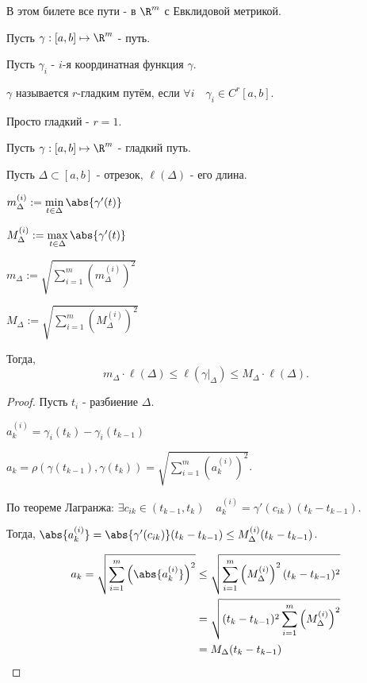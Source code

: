 
В этом билете все пути - в $\R^{m}$ с Евклидовой метрикой.

\begin{definition} \thmslashn 

    Пусть $\gamma : [a, b] \mapsto \R^{m}$ - путь.

    Пусть $\gamma_{i} $ - $i$-я координатная функция $\gamma$.

    $\gamma$ называется $r$-гладким путём, если $\forall{i}\quad \gamma_{i}\in C^{r}[a, b]$.

    Просто гладкий - $r = 1$.
\end{definition}

\begin{lemma} \thmslashn

    Пусть $\gamma : [a, b] \mapsto \R^{m}$ - гладкий путь.

    Пусть $\Delta \subset [a, b]$ - отрезок, $\ell(\Delta)$ - его длина.

    $m^{(i)}_{\Delta} := \min\limits_{t\in \Delta} \abs{\gamma'(t)}$
    
    $M^{(i)}_{\Delta} := \max\limits_{t\in \Delta} \abs{\gamma'(t)}$

    $m_{\Delta} := \sqrt{\sum\limits_{i=1}^{m} \left(m^{(i)}_{\Delta}\right)^2} $
    
    $M_{\Delta} := \sqrt{\sum\limits_{i=1}^{m} \left(M^{(i)}_{\Delta}\right)^2}$

    Тогда, 
    \[ m_{\Delta} \cdot \ell(\Delta) \le \ell(\left. \gamma\right|_{\Delta}) \le M_{\Delta} \cdot \ell(\Delta) .\]
        \begin{proof} \thmslashn
        
            Пусть $t_{i}$ - разбиение $\Delta$.

            $a_{k}^{(i)} = \gamma_{i}(t_{k}) - \gamma_{i}(t_{k-1})$

            $a_{k} = \rho(\gamma(t_{k-1}), \gamma(t_{k})) = \sqrt{\sum\limits_{i=1}^{m} \left( a_{k}^{(i)} \right)^2 } $.

            По теореме Лагранжа: $\exists{c_{ik}\in (t_{k-1}, t_{k})}\quad a_{k}^{(i)} = \gamma'(c_{ik})(t_{k} - t_{k-1})$.

            Тогда, $\abs{a_{k}^{(i)}} = \abs{\gamma'(c_{ik})}(t_{k}-t_{k-1}) \le M_{\Delta}^{(i)}(t_{k}-t_{k-1})$.

            \begin{equation*}
                \begin{split}
                    a_{k} = \sqrt{\sum\limits_{i=1}^{m} \left( \abs{a_{k}^{(i)}} \right)^2} 
                    &\le \sqrt{\sum\limits_{i=1}^{m} \left(M_{\Delta}^{(i)}\right)^2(t_{k}-t_{k-1})^2}\\
                    &= \sqrt{(t_{k} - t_{k-1})^2 \sum\limits_{i=1}^{m} \left(M_{\Delta}^{(i)}\right)^2 }\\
                    &= M_{\Delta}(t_{k}-t_{k-1})
                \end{split}
            \end{equation*}
            

\end{proof}
\end{lemma}

